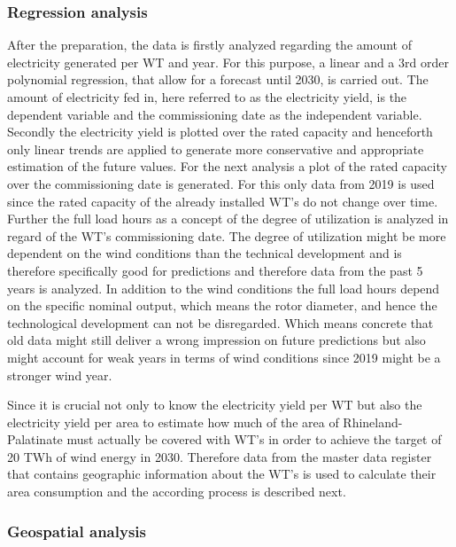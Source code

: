 \documentclass[a4paper,11pt]{article}
\begin{document}
\hypertarget{regression-analysis-1}{%
\subsubsection{Regression analysis}\label{regression-analysis-1}}

After the preparation, the data is firstly analyzed regarding the amount of electricity generated per WT and year. For this purpose, a linear and a 3rd order polynomial regression, that allow for a forecast until 2030, is carried out. The amount of electricity fed in, here referred to as the electricity yield, is the dependent variable and the commissioning date as the independent variable. Secondly the electricity yield is plotted over the rated capacity and henceforth only linear trends are applied to generate more conservative and appropriate estimation of the future values. For the next analysis a plot of the rated capacity over the commissioning date is generated. For this only data from 2019 is used since the rated capacity of the already installed WT's do not change over time. Further the full load hours as a concept of the degree of utilization is analyzed in regard of the WT's commissioning date. The degree of utilization might be more dependent on the wind conditions than the technical development and is therefore specifically good for predictions and therefore data from the past 5 years is analyzed. In addition to the wind conditions the full load hours depend on the specific nominal output, which means the rotor diameter, and hence the technological development can not be disregarded. Which means concrete that old data might still deliver a wrong impression on future predictions but also might account for weak years in terms of wind conditions since 2019 might be a stronger wind year.

Since it is crucial not only to know the electricity yield per WT but also the electricity yield per area to estimate how much of the area of Rhineland-Palatinate must actually be covered with WT's in order to achieve the target of 20 TWh of wind energy in 2030. Therefore data from the master data register that contains geographic information about the WT's is used to calculate their area consumption and the according process is described next.

\hypertarget{geospatial-analysis-1}{%
\subsubsection{Geospatial analysis}\label{geospatial-analysis-1}}
\end{document}

